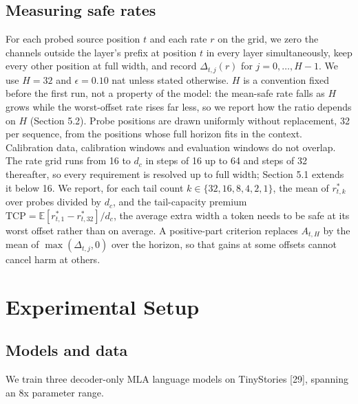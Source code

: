 \documentclass[11pt]{article}
\begin{document}
\subsection{Measuring safe rates}

For each probed source position $t$ and each rate $r$ on the grid, we zero the channels outside the layer's prefix at position $t$ in every layer simultaneously, keep every other position at full width, and record $\Delta_{t,j}(r)$ for $j=0,\ldots,H-1$. We use $H=32$ and $\epsilon=0.10$ nat unless stated otherwise. $H$ is a convention fixed before the first run, not a property of the model: the mean-safe rate falls as $H$ grows while the worst-offset rate rises far less, so we report how the ratio depends on $H$ (Section 5.2). Probe positions are drawn uniformly without replacement, 32 per sequence, from the positions whose full horizon fits in the context. Calibration data, calibration windows and evaluation windows do not overlap. The rate grid runs from 16 to $d_c$ in steps of 16 up to 64 and steps of 32 thereafter, so every requirement is resolved up to full width; Section 5.1 extends it below 16. We report, for each tail count $k\in\{32,16,8,4,2,1\}$, the mean of $r^*_{t,k}$ over probes divided by $d_c$, and the tail-capacity premium $\mathrm{TCP}=\mathbb E[r^*_{t,1}- r^*_{t,32}]/d_c$, the average extra width a token needs to be safe at its worst offset rather than on average. A positive-part criterion replaces $A_{t,H}$ by the mean of $\max(\Delta_{t,j},0)$ over the horizon, so that gains at some offsets cannot cancel harm at others.

\section{Experimental Setup}

\subsection{Models and data}

We train three decoder-only MLA language models on TinyStories [29], spanning an 8x parameter range.

\begin{table}[t]
\centering
\caption{The three MLA language models trained for this study, all on TinyStories.}
\end{table}
\end{document}
